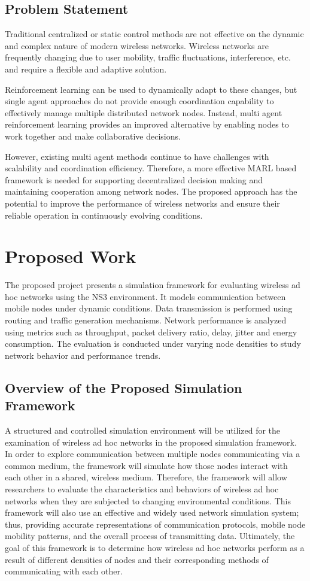\documentclass[a4paper,fleqn]{cas-dc}
\numberwithin{equation}{section}
\begin{document}
\subsection{Problem Statement}
Traditional centralized or static control methods are not effective on the dynamic and complex nature of modern wireless networks. Wireless networks are frequently changing due to user mobility, traffic fluctuations, interference, etc. and require a flexible and adaptive solution.

Reinforcement learning can be used to dynamically adapt to these changes, but single agent approaches do not provide enough coordination capability to effectively manage multiple distributed network nodes. Instead, multi agent reinforcement learning  provides an improved alternative by enabling nodes to work together and make collaborative decisions.

However, existing multi agent methods continue to have challenges with scalability and coordination efficiency. Therefore, a more effective MARL based framework is needed for supporting decentralized decision making and maintaining cooperation among network nodes. The proposed approach has the potential to improve the performance of wireless networks and ensure their reliable operation in continuously evolving conditions.


\section{Proposed Work}
The proposed project presents a simulation framework for evaluating wireless ad hoc networks using the NS3 environment. It models communication between mobile nodes under dynamic conditions. Data transmission is performed using routing and traffic generation mechanisms. Network performance is analyzed using metrics such as throughput, packet delivery ratio, delay, jitter and energy consumption. The evaluation is conducted under varying node densities to study network behavior and performance trends.


\subsection{Overview of the Proposed Simulation Framework}

A structured and controlled simulation environment will be utilized for the examination of wireless ad hoc networks in the proposed simulation framework. In order to explore communication between multiple nodes communicating via a common medium, the framework will simulate how those nodes interact with each other in a shared, wireless medium. Therefore, the framework will allow researchers to evaluate the characteristics and behaviors of wireless ad hoc networks when they are subjected to changing environmental conditions. This framework will also use an effective and widely used network simulation system; thus, providing accurate representations of communication protocols, mobile node mobility patterns, and the overall process of transmitting data. Ultimately, the goal of this framework is to determine how wireless ad hoc networks perform as a result of different densities of nodes and their corresponding methods of communicating with each other.
\end{document}
